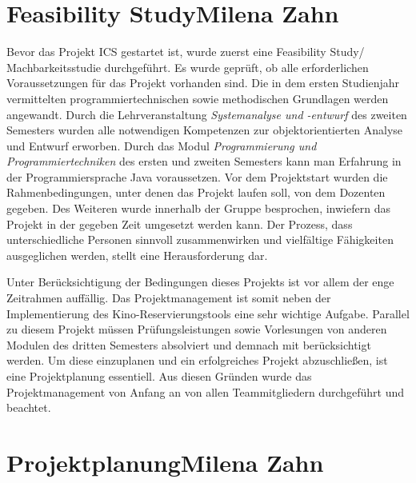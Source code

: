 	\section[Feasibility Study]{Feasibility Study{\hfill \normalsize Milena Zahn}}
	Bevor das Projekt \ac{ICS} gestartet ist, wurde zuerst eine Feasibility Study/ Machbarkeitsstudie durchgeführt. Es wurde geprüft, ob alle erforderlichen Voraussetzungen für das Projekt vorhanden sind. Die in dem ersten Studienjahr vermittelten programmiertechnischen sowie methodischen Grundlagen werden angewandt. Durch die Lehrveranstaltung \textit{Systemanalyse und -entwurf} des zweiten Semesters wurden alle notwendigen Kompetenzen zur objektorientierten Analyse und Entwurf erworben. Durch das Modul \textit{Programmierung und Programmiertechniken} des ersten und zweiten Semesters kann man Erfahrung in der Programmiersprache Java voraussetzen. Vor dem Projektstart wurden die Rahmenbedingungen, unter denen das Projekt laufen soll, von dem Dozenten gegeben. Des Weiteren wurde innerhalb der Gruppe besprochen, inwiefern das Projekt in der gegeben Zeit umgesetzt werden kann. Der Prozess, dass unterschiedliche Personen sinnvoll zusammenwirken und vielfältige Fähigkeiten  ausgeglichen werden, stellt eine Herausforderung dar.
	
	Unter Berücksichtigung der Bedingungen dieses Projekts ist vor allem der enge Zeitrahmen auffällig. Das Projektmanagement ist somit neben der Implementierung des Kino-Reservierungstools eine sehr wichtige Aufgabe. Parallel zu diesem Projekt müssen Prüfungsleistungen sowie Vorlesungen von anderen Modulen des dritten Semesters absolviert und demnach mit berücksichtigt werden. Um diese einzuplanen und ein erfolgreiches Projekt abzuschließen, ist eine Projektplanung essentiell. Aus diesen Gründen wurde das Projektmanagement von Anfang an von allen Teammitgliedern durchgeführt und beachtet.
	
	\section[Projektplanung]{Projektplanung{\hfill \normalsize Milena Zahn}} \label{projektplan}
